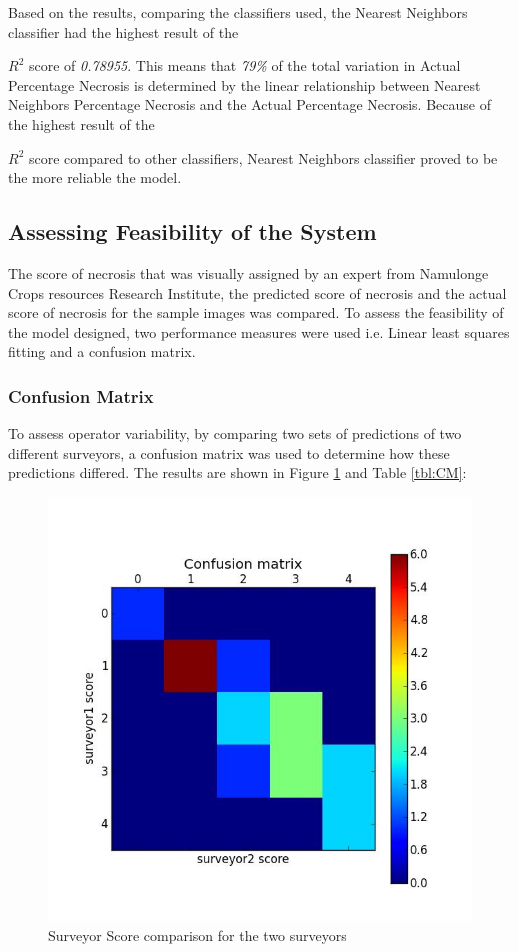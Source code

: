 \documentclass[conference]{IEEEtran}
\begin{document}
\noindent Based on the results, comparing the classifiers used, the Nearest Neighbors classifier had the highest result of the {$R^{2}$ score of \emph{0.78955}. This means that \emph{79\% }of the total variation in Actual Percentage Necrosis is determined by the linear relationship between Nearest Neighbors Percentage Necrosis and the Actual Percentage Necrosis. Because of the highest result of the {$R^{2}$ score compared to other classifiers, Nearest Neighbors classifier proved to be the more reliable the model.

\subsection{Assessing Feasibility of the System}
The score of necrosis that was visually assigned by an expert from Namulonge Crops resources Research Institute, the predicted score of necrosis and the actual score of necrosis for the sample images was compared. To assess the feasibility of the model designed, two performance measures were used i.e. Linear least squares fitting and a confusion matrix.


\subsubsection{Confusion Matrix}
To assess operator variability, by comparing two sets of predictions of two different surveyors, a confusion matrix was used to determine how these predictions differed. The results are shown in Figure \ref{fig:CONM} and Table \ref{tbl:CM}:



\begin{figure}[t!]
\centering
\includegraphics[scale=0.2]{images/confusionmatrix.jpg}
\caption{Surveyor Score comparison for the two surveyors }
\label{fig:CONM}
\end{figure}

}}
\end{document}
